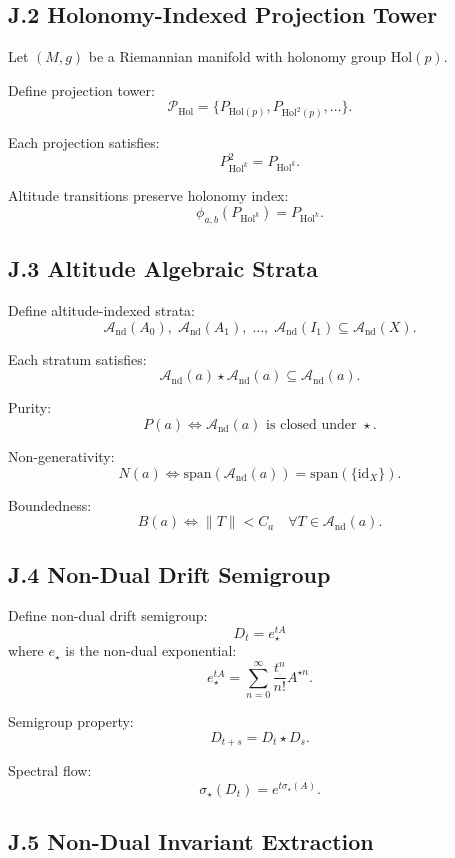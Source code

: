 \subsection*{J.2 Holonomy-Indexed Projection Tower}

Let $(M,g)$ be a Riemannian manifold with holonomy group $\mathrm{Hol}(p)$.

Define projection tower:
\[
\mathcal{P}_{\mathrm{Hol}} =
\{ P_{\mathrm{Hol}(p)}, P_{\mathrm{Hol}^2(p)}, \dots \}.
\]

Each projection satisfies:
\[
P_{\mathrm{Hol}^k}^2 = P_{\mathrm{Hol}^k}.
\]

Altitude transitions preserve holonomy index:
\[
\phi_{a,b}(P_{\mathrm{Hol}^k}) = P_{\mathrm{Hol}^k}.
\]

\subsection*{J.3 Altitude Algebraic Strata}

Define altitude-indexed strata:
\[
\mathcal{A}_{\mathrm{nd}}(A_0),\;
\mathcal{A}_{\mathrm{nd}}(A_1),\;
\dots,\;
\mathcal{A}_{\mathrm{nd}}(I_1)
\subseteq \mathcal{A}_{\mathrm{nd}}(X).
\]

Each stratum satisfies:
\[
\mathcal{A}_{\mathrm{nd}}(a) \star \mathcal{A}_{\mathrm{nd}}(a)
\subseteq \mathcal{A}_{\mathrm{nd}}(a).
\]

Purity:
\[
P(a) \iff \mathcal{A}_{\mathrm{nd}}(a) \text{ is closed under } \star.
\]

Non-generativity:
\[
N(a) \iff \mathrm{span}(\mathcal{A}_{\mathrm{nd}}(a))
= \mathrm{span}(\{\mathrm{id}_X\}).
\]

Boundedness:
\[
B(a) \iff \|T\| < C_a \quad \forall T \in \mathcal{A}_{\mathrm{nd}}(a).
\]

\subsection*{J.4 Non-Dual Drift Semigroup}

Define non-dual drift semigroup:
\[
D_t = e_{\star}^{tA}
\]
where $e_{\star}$ is the non-dual exponential:
\[
e_{\star}^{tA} = \sum_{n=0}^{\infty} \frac{t^n}{n!} A^{\star n}.
\]

Semigroup property:
\[
D_{t+s} = D_t \star D_s.
\]

Spectral flow:
\[
\sigma_{\star}(D_t) = e^{t\sigma_{\star}(A)}.
\]

\subsection*{J.5 Non-Dual Invariant Extraction}

